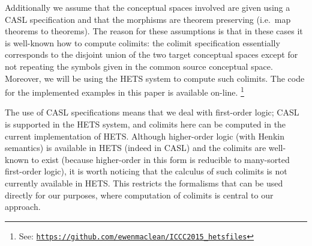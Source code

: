 Additionally we assume that the conceptual spaces involved are %
given using a CASL specification \parencite{astesiano2002casl} and that the
morphisms are theorem preserving (i.e.\ map theorems to theorems).
The reason for these assumptions is that in these cases
it is well-known how to compute %
colimits: the colimit
specification essentially corresponds to the disjoint union of the two
target conceptual spaces except for not repeating the symbols given in
the common source conceptual space.  Moreover, we will be using the
HETS system \parencite{MossakowskiEA06} to compute such colimits.
The code for the implemented examples in this paper
is available on-line.%
\footnote{See: \texttt{\url{https://github.com/ewenmaclean/ICCC2015_hetsfiles}}}

The use of CASL specifications means that we deal with first-order
logic; CASL is supported in the HETS system, and colimits here can be
computed in the current implementation of HETS. Although higher-order
logic (with Henkin semantics) is available in HETS (indeed in CASL)
and the colimits are well-known to exist (because higher-order in this
form is reducible to many-sorted first-order logic), it is worth
noticing that the calculus of such colimits is not currently available
in HETS.  This restricts the formalisms that can be used directly for
our purposes, where computation of colimits is central to our
approach.


